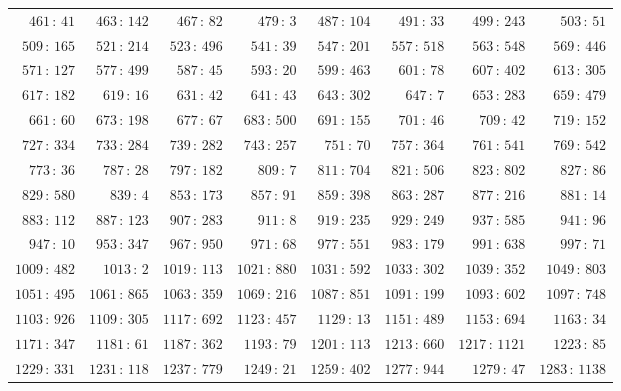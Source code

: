 \documentclass[11pt]{article}
\theoremstyle{plain}
\theoremstyle{definition}
\theoremstyle{remark}
\begin{document}
\begin{center}
\begin{tabular}{rrrrrrrr}
$461\,{:}\,41$ & $463\,{:}\,142$ & $467\,{:}\,82$ & $479\,{:}\,3$ & $487\,{:}\,104$ & $491\,{:}\,33$ & $499\,{:}\,243$ & $503\,{:}\,51$ \\
$509\,{:}\,165$ & $521\,{:}\,214$ & $523\,{:}\,496$ & $541\,{:}\,39$ & $547\,{:}\,201$ & $557\,{:}\,518$ & $563\,{:}\,548$ & $569\,{:}\,446$ \\
$571\,{:}\,127$ & $577\,{:}\,499$ & $587\,{:}\,45$ & $593\,{:}\,20$ & $599\,{:}\,463$ & $601\,{:}\,78$ & $607\,{:}\,402$ & $613\,{:}\,305$ \\
$617\,{:}\,182$ & $619\,{:}\,16$ & $631\,{:}\,42$ & $641\,{:}\,43$ & $643\,{:}\,302$ & $647\,{:}\,7$ & $653\,{:}\,283$ & $659\,{:}\,479$ \\
$661\,{:}\,60$ & $673\,{:}\,198$ & $677\,{:}\,67$ & $683\,{:}\,500$ & $691\,{:}\,155$ & $701\,{:}\,46$ & $709\,{:}\,42$ & $719\,{:}\,152$ \\
$727\,{:}\,334$ & $733\,{:}\,284$ & $739\,{:}\,282$ & $743\,{:}\,257$ & $751\,{:}\,70$ & $757\,{:}\,364$ & $761\,{:}\,541$ & $769\,{:}\,542$ \\
$773\,{:}\,36$ & $787\,{:}\,28$ & $797\,{:}\,182$ & $809\,{:}\,7$ & $811\,{:}\,704$ & $821\,{:}\,506$ & $823\,{:}\,802$ & $827\,{:}\,86$ \\
$829\,{:}\,580$ & $839\,{:}\,4$ & $853\,{:}\,173$ & $857\,{:}\,91$ & $859\,{:}\,398$ & $863\,{:}\,287$ & $877\,{:}\,216$ & $881\,{:}\,14$ \\
$883\,{:}\,112$ & $887\,{:}\,123$ & $907\,{:}\,283$ & $911\,{:}\,8$ & $919\,{:}\,235$ & $929\,{:}\,249$ & $937\,{:}\,585$ & $941\,{:}\,96$ \\
$947\,{:}\,10$ & $953\,{:}\,347$ & $967\,{:}\,950$ & $971\,{:}\,68$ & $977\,{:}\,551$ & $983\,{:}\,179$ & $991\,{:}\,638$ & $997\,{:}\,71$ \\
$1009\,{:}\,482$ & $1013\,{:}\,2$ & $1019\,{:}\,113$ & $1021\,{:}\,880$ & $1031\,{:}\,592$ & $1033\,{:}\,302$ & $1039\,{:}\,352$ & $1049\,{:}\,803$ \\
$1051\,{:}\,495$ & $1061\,{:}\,865$ & $1063\,{:}\,359$ & $1069\,{:}\,216$ & $1087\,{:}\,851$ & $1091\,{:}\,199$ & $1093\,{:}\,602$ & $1097\,{:}\,748$ \\
$1103\,{:}\,926$ & $1109\,{:}\,305$ & $1117\,{:}\,692$ & $1123\,{:}\,457$ & $1129\,{:}\,13$ & $1151\,{:}\,489$ & $1153\,{:}\,694$ & $1163\,{:}\,34$ \\
$1171\,{:}\,347$ & $1181\,{:}\,61$ & $1187\,{:}\,362$ & $1193\,{:}\,79$ & $1201\,{:}\,113$ & $1213\,{:}\,660$ & $1217\,{:}\,1121$ & $1223\,{:}\,85$ \\
$1229\,{:}\,331$ & $1231\,{:}\,118$ & $1237\,{:}\,779$ & $1249\,{:}\,21$ & $1259\,{:}\,402$ & $1277\,{:}\,944$ & $1279\,{:}\,47$ & $1283\,{:}\,1138$ \\

\end{tabular}
\end{center}
\end{document}
